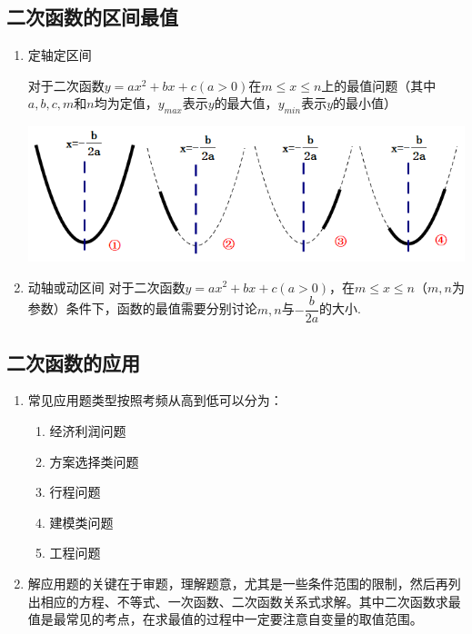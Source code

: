 \documentclass[10pt]{ctexart}
\begin{document}
\subsection{二次函数的区间最值}
\begin{enumerate}
\item 定轴定区间

对于二次函数$y=ax^2+bx+c(a>0)$在$m\leq x\leq n$上的最值问题（其中$a,b,c,m$和$n$均为定值，$y_{max}$表示$y$的最大值，$y_{min}$表示$y$的最小值）
\begin{enumerate}[(1)]

\includegraphics[scale=0.8]{figure/6-1.PNG} 
\end{enumerate}
\item 动轴或动区间
对于二次函数$y=ax^2+bx+c(a>0)$，在$m\leq x\leq n$（$m,n$为参数）条件下，函数的最值需要分别讨论$m,n$与$-\dfrac{b}{2a}$的大小.
\end{enumerate}
\subsection{二次函数的应用}
\begin{enumerate}
\item 常见应用题类型按照考频从高到低可以分为：
\begin{enumerate}[(1)]
\item 经济利润问题
\item 方案选择类问题
\item 行程问题
\item 建模类问题
\item 工程问题
\end{enumerate}
\item 解应用题的关键在于审题，理解题意，尤其是一些条件范围的限制，然后再列出相应的方程、不等式、一次函数、二次函数关系式求解。其中二次函数求最值是最常见的考点，在求最值的过程中一定要注意自变量的取值范围。
\end{enumerate}
\end{document}
